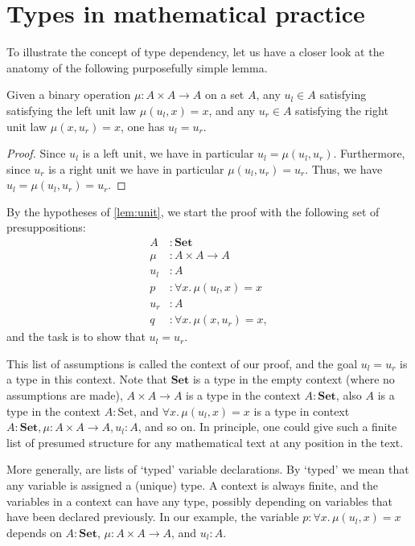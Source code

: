 \section{Types in mathematical practice}


To illustrate the concept of type dependency, let us have a closer look at the anatomy of the following purposefully simple lemma.

\begin{lem}\label{lem:unit}
Given a binary operation $\mu:A\times A\to A$ on a set $A$, any $u_l\in A$ satisfying satisfying the left unit law $\mu(u_l,x)=x$, and any $u_r\in A$ satisfying the right unit law $\mu(x,u_r)=x$, one has $u_l=u_r$. 
\end{lem}

\begin{proof}
Since $u_l$ is a left unit, we have in particular $u_l=\mu(u_l,u_r)$. Furthermore, since $u_r$ is a right unit we have in particular $\mu(u_l,u_r)=u_r$. Thus, we have $u_l=\mu(u_l,u_r)=u_r$. 
\end{proof}

\begin{samepage}
By the hypotheses of \cref{lem:unit}, we start the proof with the following set of presuppositions:
\begin{align*}
A & : \mathbf{Set} \\
\mu & : A\times A\to A \\
u_l & : A \\
p & : \forall x.\,\mu(u_l,x)=x\\
u_r & : A \\
q & : \forall x.\,\mu(x,u_r)=x,
\end{align*}
and the task is to show that $u_l=u_r$.
\end{samepage}

This list of assumptions is called the context of our proof, and the goal $u_l=u_r$ is a type in this context. 
Note that $\mathbf{Set}$ is a type in the empty context (where no assumptions are made), $A\times A\to A$ is a type in the context $A:\mathbf{Set}$, also $A$ is a type in the context $A:\mathrm{Set}$, and $\forall x.\,\mu(u_l,x)=x$ is a type in context $A:\mathbf{Set},\mu:A\times A\to A,u_l:A$, and so on.
In principle, one could give such a finite list of presumed structure for any mathematical text at any position in the text.

More generally,  are lists of `typed' variable declarations. By `typed' we mean that any variable is assigned a (unique) type. A context is always finite, and the variables in a context can have any type, possibly depending on variables that have been declared previously. In our example, the variable $p:\forall x.\,\mu(u_l,x)=x$ depends on $A:\mathbf{Set}$, $\mu:A\times A\to A$, and $u_l:A$. 
